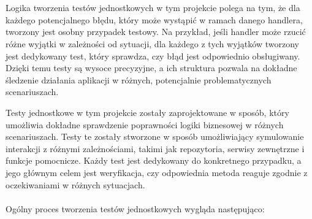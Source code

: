 \documentclass[12pt,a4paper]{article}
\begin{document}
\\\\
Logika tworzenia testów jednostkowych w tym projekcie polega na tym, że dla każdego potencjalnego błędu, który może wystąpić w ramach danego handlera, tworzony jest osobny przypadek testowy. Na przykład, jeśli handler może rzucić różne wyjątki w zależności od sytuacji, dla każdego z tych wyjątków tworzony jest dedykowany test, który sprawdza, czy błąd jest odpowiednio obsługiwany. Dzięki temu testy są wysoce precyzyjne, a ich struktura pozwala na dokładne śledzenie działania aplikacji w różnych, potencjalnie problematycznych scenariuszach.

\newpage

\noindent
Testy jednostkowe w tym projekcie zostały zaprojektowane w sposób, który umożliwia dokładne sprawdzenie poprawności logiki biznesowej w różnych scenariuszach. Testy te zostały stworzone w sposób umożliwiający symulowanie interakcji z różnymi zależnościami, takimi jak repozytoria, serwisy zewnętrzne i funkcje pomocnicze. Każdy test jest dedykowany do konkretnego przypadku, a jego głównym celem jest weryfikacja, czy odpowiednia metoda reaguje zgodnie z oczekiwaniami w różnych sytuacjach.
\\\\
Ogólny proces tworzenia testów jednostkowych wygląda następująco:
\end{document}
